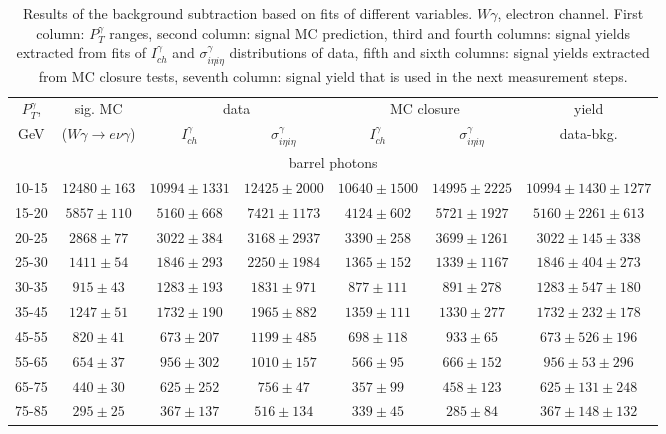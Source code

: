\begin{table}[h]
  \tiny
  \begin{center}
  \caption{Results of the background subtraction based on fits of different variables. $W\gamma$, electron channel. First column: $P_T^{\gamma}$ ranges, second column: signal MC prediction, third and fourth columns: signal yields extracted from fits of $I_{ch}^{\gamma}$ and $\sigma_{i\eta i\eta}^\gamma$ distributions of data, fifth and sixth columns: signal yields extracted from MC closure tests, seventh column: signal yield that is used in the next measurement steps.}
  \begin{tabular}{|c|c|c|c|c|c|c|}
    $P_T^{\gamma}$, &  sig. MC   & \multicolumn{2}{|c|}{data}  & \multicolumn{2}{|c|}{MC closure} & yield\\ 
    GeV & ($W\gamma\rightarrow e\nu\gamma$) & $I_{ch}^{\gamma}$ & $\sigma_{i\eta i\eta}^\gamma$  & $I_{ch}^{\gamma}$  & $\sigma_{i\eta i\eta}^\gamma$   & data-bkg. \\ \hline
    \multicolumn{7}{|c|}{barrel photons} \\ \hline
    10-15 & $12480\pm163$ & $10994\pm1331$ & $12425\pm2000$ & $10640\pm1500$ & $14995\pm2225$ &$10994\pm1430\pm1277$  \\ \hline
    15-20 & $5857\pm110$ & $5160\pm668$ & $7421\pm1173$ & $4124\pm602$ & $5721\pm1927$ &$5160\pm2261\pm613$  \\ \hline
    20-25 & $2868\pm77$ & $3022\pm384$ & $3168\pm2937$ & $3390\pm258$ & $3699\pm1261$ &$3022\pm145\pm338$  \\ \hline
    25-30 & $1411\pm54$ & $1846\pm293$ & $2250\pm1984$ & $1365\pm152$ & $1339\pm1167$ &$1846\pm404\pm273$  \\ \hline
    30-35 & $915\pm43$ & $1283\pm193$ & $1831\pm971$ & $877\pm111$ & $891\pm278$ &$1283\pm547\pm180$  \\ \hline
    35-45 & $1247\pm51$ & $1732\pm190$ & $1965\pm882$ & $1359\pm111$ & $1330\pm277$ &$1732\pm232\pm178$  \\ \hline
    45-55 & $820\pm41$ & $673\pm207$ & $1199\pm485$ & $698\pm118$ & $933\pm65$ &$673\pm526\pm196$  \\ \hline
    55-65 & $654\pm37$ & $956\pm302$ & $1010\pm157$ & $566\pm95$ & $666\pm152$ &$956\pm53\pm296$  \\ \hline
    65-75 & $440\pm30$ & $625\pm252$ & $756\pm47$ & $357\pm99$ & $458\pm123$ &$625\pm131\pm248$  \\ \hline
    75-85 & $295\pm25$ & $367\pm137$ & $516\pm134$ & $339\pm45$ & $285\pm84$ &$367\pm148\pm132$  \\ \hline

\end{tabular}
\end{center}
\end{table}
